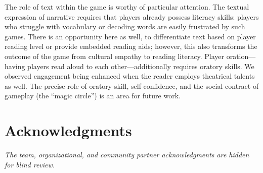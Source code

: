 \documentclass[a4paper]{article}
\begin{document}
The role of text within the game is worthy of particular attention.
The textual expression of narrative requires that players already possess
literacy skills: players who struggle with vocabulary or decoding words
are easily frustrated by such games. There is an opportunity
here as well, to differentiate text based on player reading level
or provide embedded reading aids; however, this also transforms
the outcome of the game from cultural empathy to reading literacy.
Player oration---having players read aloud to each
other---additionally requires oratory skills. We observed engagement
being enhanced when the reader employs theatrical talents as well.
The precise role of oratory skill, self-confidence, and the social
contract of gameplay (the ``magic circle'') is an area for future work.


\section{Acknowledgments}
\textit{The team, organizational, and community partner
  acknowledgments are hidden for blind review.}



\end{document}
